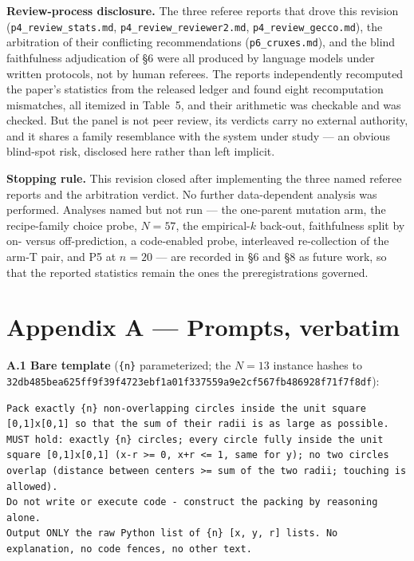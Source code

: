 \documentclass[11pt]{article}
\begin{document}
\textbf{Review-process disclosure.} The three referee reports that drove this revision
(\texttt{p4\_review\_stats.md}, \texttt{p4\_review\_reviewer2.md}, \texttt{p4\_review\_gecco.md}), the arbitration of their
conflicting recommendations (\texttt{p6\_cruxes.md}), and the blind faithfulness adjudication of \S6 were
all produced by language models under written protocols, not by human referees. The reports
independently recomputed the paper's statistics from the released ledger and found eight
recomputation mismatches, all itemized in Table~5, and their arithmetic was checkable and was
checked. But the panel is not peer review, its verdicts carry no external authority, and it
shares a family resemblance with the system under study --- an obvious blind-spot risk, disclosed
here rather than left implicit.

\textbf{Stopping rule.} This revision closed after implementing the three named referee reports and
the arbitration verdict. No further data-dependent analysis was performed. Analyses named but
not run --- the one-parent mutation arm, the recipe-family choice probe, $N = 57$, the empirical-$k$
back-out, faithfulness split by on- versus off-prediction, a code-enabled probe, interleaved
re-collection of the arm-T pair, and P5 at $n = 20$ --- are recorded in \S6 and \S8 as future work, so
that the reported statistics remain the ones the preregistrations governed.

\appendix
\section*{Appendix A --- Prompts, verbatim}

\textbf{A.1 Bare template} (\texttt{\{n\}} parameterized; the $N = 13$ instance hashes to
\texttt{32db485bea625ff9f39f4723ebf1a01f337559a9e2cf567fb486928f71f7f8df}):

\begin{lstlisting}
Pack exactly {n} non-overlapping circles inside the unit square [0,1]x[0,1] so that the sum of their radii is as large as possible.
MUST hold: exactly {n} circles; every circle fully inside the unit square [0,1]x[0,1] (x-r >= 0, x+r <= 1, same for y); no two circles overlap (distance between centers >= sum of the two radii; touching is allowed).
Do not write or execute code - construct the packing by reasoning alone.
Output ONLY the raw Python list of {n} [x, y, r] lists. No explanation, no code fences, no other text.
\end{lstlisting}
\end{document}
